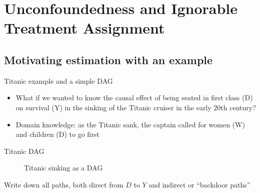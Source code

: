 \documentclass{beamer}
\begin{document}
\section{Unconfoundedness and Ignorable Treatment Assignment}

\subsection{Motivating estimation with an example}






\begin{frame}{Titanic example and a simple DAG}

\begin{itemize}

\item What if we wanted to know the causal effect of being seated in first class (D) on survival (Y) in the sinking of the Titanic cruiser in the early 20th century?  
\item Domain knowledge: as the Titanic sank, the captain called for women (W) and children (D) to go first

\end{itemize}

\end{frame}




\begin{frame}{Titanic DAG}

\begin{figure}
\begin{center}
\caption{Titanic sinking as a DAG}
\label{fig:backdoor_dag}
\end{center}
\end{figure}

\bigskip

Write down all paths, both direct from $D$ to $Y$ and indirect or ``backdoor paths'' 

\end{frame}
\end{document}
